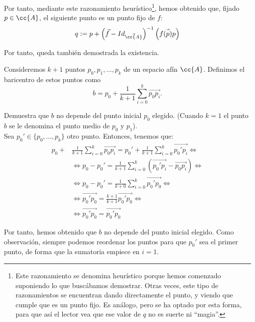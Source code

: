 \begin{ejercicio}
\begin{enumerate}
        Por tanto, mediante este razonamiento heurístico\footnote{Este razonamiento se denomina heurístico porque hemos 
        comenzado suponiendo lo que buscábamos demostrar. Otras veces, este tipo de razonamientos se encuentran dando directamente el punto,
        y viendo que cumple que es un punto fijo. Es análogo, pero se ha optado por esta forma, para que así el lector vea
        que ese valor de $q$ no es suerte ni ``magia''.}, hemos obtenido que, fijado $p\in \cc{A}$, el siguiente punto es un punto fijo de $f$:
        \begin{equation*}
            q:= p + \left(\vec{f} - Id_{\vec{\cc{A}}}\right)^{-1}\left(\vec{f(p)p}\right)
        \end{equation*}

        Por tanto, queda también demostrada la existencia.       
    \end{enumerate}
\end{ejercicio}

\begin{ejercicio}
    Consideremos $k + 1$ puntos $p_0, p_1, \dots , p_k$ de un espacio afín $\cc{A}$. Definimos el baricentro de estos puntos como
    \begin{equation*}
        b=p_0+\frac{1}{k+1} \sum_{i=0}^k \vec{p_0p_i}.
    \end{equation*}

    Demuestra que $b$ no depende del punto inicial $p_0$ elegido. (Cuando $k = 1$ el punto $b$ se le denomina el punto medio de $p_0$ y $p_1$).\\

    Sea $p_0'\in \{p_0,\dots,p_k\}$ otro punto. Entonces, tenemos que:
    \begin{equation*}\begin{split}
        p_0+&\frac{1}{k+1}\sum_{i=0}^k \vec{p_0p_i} = p_0'+ \frac{1}{k+1}\sum_{i=0}^k \vec{p_0'p_i} \Longleftrightarrow \\
        &\Longleftrightarrow p_0-p_0' = \frac{1}{k+1}\sum_{i=0}^{k}\left(\vec{p_0'p_i} - \vec{p_0p_i}\right) \Longleftrightarrow\\
        &\Longleftrightarrow p_0-p_0' = \frac{1}{k+0}\sum_{i=0}^{k}\vec{p_0'p_0} \Longleftrightarrow\\
        &\Longleftrightarrow \vec{p_0'p_0} = \frac{k+1}{k+1}\vec{p_0'p_0} \Longleftrightarrow\\
        &\Longleftrightarrow \vec{p_0'p_0} = \vec{p_0'p_0}
    \end{split}\end{equation*}

    Por tanto, hemos obtenido que $b$ no depende del punto inicial elegido. Como observación, siempre podemos reordenar los puntos para que $p_0'$ sea el primer punto, de forma que la sumatoria empiece en $i=1$.
\end{ejercicio}

